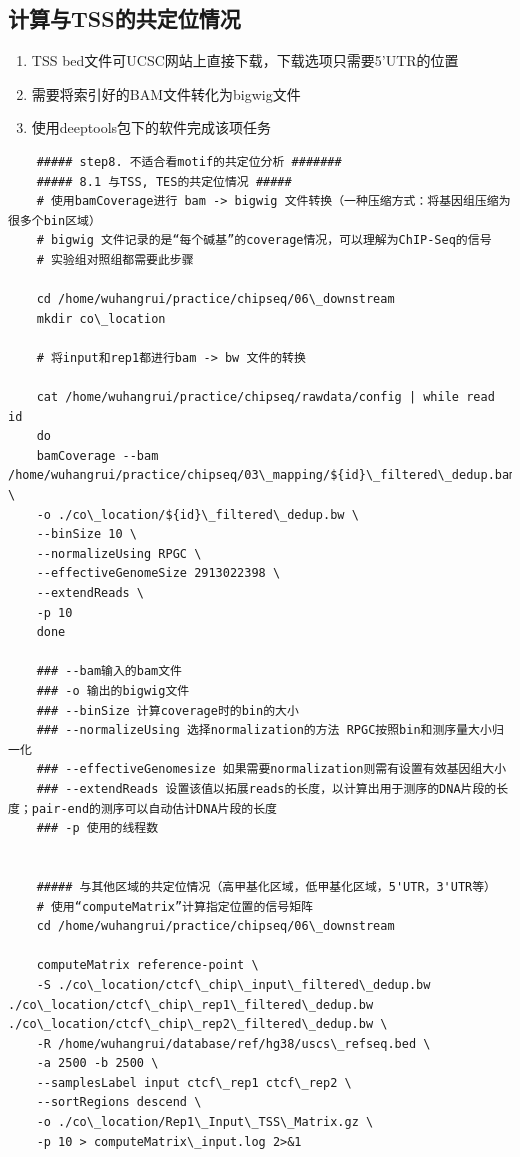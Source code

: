 \subsection{计算与TSS的共定位情况}
\begin{enumerate}
    \item TSS bed文件可UCSC网站上直接下载，下载选项只需要5’UTR的位置
    \item 需要将索引好的BAM文件转化为bigwig文件
    \item 使用deeptools包下的软件完成该项任务
\end{enumerate}
\begin{lstlisting}
    ##### step8. 不适合看motif的共定位分析 #######
    ##### 8.1 与TSS, TES的共定位情况 #####
    # 使用bamCoverage进行 bam -> bigwig 文件转换（一种压缩方式：将基因组压缩为很多个bin区域）
    # bigwig 文件记录的是“每个碱基”的coverage情况，可以理解为ChIP-Seq的信号
    # 实验组对照组都需要此步骤

    cd /home/wuhangrui/practice/chipseq/06\_downstream
    mkdir co\_location

    # 将input和rep1都进行bam -> bw 文件的转换

    cat /home/wuhangrui/practice/chipseq/rawdata/config | while read id
    do
    bamCoverage --bam /home/wuhangrui/practice/chipseq/03\_mapping/${id}\_filtered\_dedup.bam \
    -o ./co\_location/${id}\_filtered\_dedup.bw \
    --binSize 10 \
    --normalizeUsing RPGC \
    --effectiveGenomeSize 2913022398 \
    --extendReads \
    -p 10
    done

    ### --bam输入的bam文件
    ### -o 输出的bigwig文件
    ### --binSize 计算coverage时的bin的大小
    ### --normalizeUsing 选择normalization的方法 RPGC按照bin和测序量大小归一化
    ### --effectiveGenomesize 如果需要normalization则需有设置有效基因组大小
    ### --extendReads 设置该值以拓展reads的长度，以计算出用于测序的DNA片段的长度；pair-end的测序可以自动估计DNA片段的长度
    ### -p 使用的线程数


    ##### 与其他区域的共定位情况（高甲基化区域，低甲基化区域，5'UTR，3'UTR等）
    # 使用“computeMatrix”计算指定位置的信号矩阵
    cd /home/wuhangrui/practice/chipseq/06\_downstream

    computeMatrix reference-point \
    -S ./co\_location/ctcf\_chip\_input\_filtered\_dedup.bw ./co\_location/ctcf\_chip\_rep1\_filtered\_dedup.bw ./co\_location/ctcf\_chip\_rep2\_filtered\_dedup.bw \
    -R /home/wuhangrui/database/ref/hg38/uscs\_refseq.bed \
    -a 2500 -b 2500 \
    --samplesLabel input ctcf\_rep1 ctcf\_rep2 \
    --sortRegions descend \
    -o ./co\_location/Rep1\_Input\_TSS\_Matrix.gz \
    -p 10 > computeMatrix\_input.log 2>&1


\end{lstlisting}
